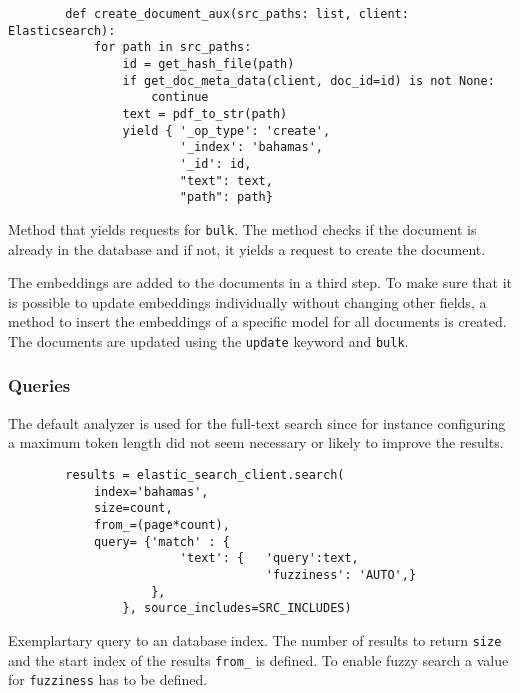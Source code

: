 \begin{listing}[htp]
    \begin{verbatim}
        def create_document_aux(src_paths: list, client: Elasticsearch):  
            for path in src_paths:           
                id = get_hash_file(path)
                if get_doc_meta_data(client, doc_id=id) is not None:
                    continue
                text = pdf_to_str(path)
                yield { '_op_type': 'create',
                        '_index': 'bahamas',
                        '_id': id,
                        "text": text,
                        "path": path}
    \end{verbatim}
    \caption[Method that yields requests for \texttt{bulk}]
    {Method that yields requests for \texttt{bulk}.
    The method checks if the document is already in the database and if not, it yields a request to create the document.
    }
    \label{lst:db_bulk_yield}
\end{listing}

The embeddings are added to the documents in a third step.
To make sure that it is possible to update embeddings individually without changing other fields, 
a method to insert the embeddings of a specific model for all documents is created.
The documents are updated using the \texttt{update} keyword and \texttt{bulk}.


\subsubsection*{Queries}
The default analyzer is used for the full-text search since for instance configuring a maximum token length did not seem necessary or likely to improve the results.

\begin{listing}[htp]
    \begin{verbatim}
        results = elastic_search_client.search(
            index='bahamas', 
            size=count,
            from_=(page*count),
            query= {'match' : {
                        'text': {   'query':text,
                                    'fuzziness': 'AUTO',}
                    }, 
                }, source_includes=SRC_INCLUDES)
    \end{verbatim}
    \caption[Query to an \databaseName database index]{Exemplartary query to an \databaseName database index.
    The number of results to return \texttt{size} and the start index of the results \texttt{from\_} is defined.
    To enable fuzzy search a value for \texttt{fuzziness} has to be defined. 
    }
    \label{lst:fuzzy_query}
\end{listing}

